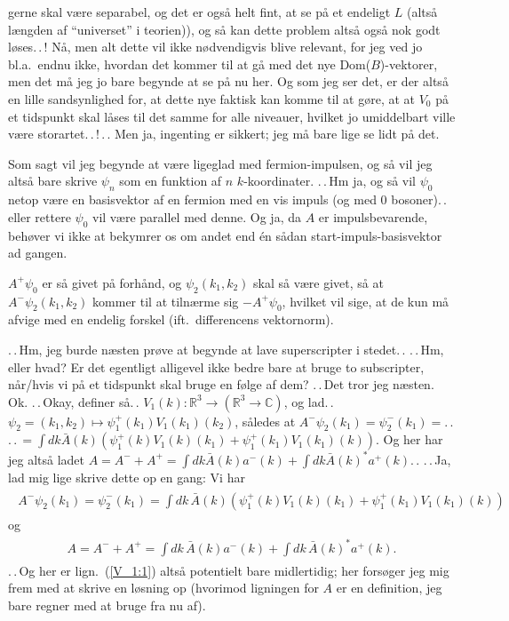 \documentclass{report}
\begin{document}
gerne skal være separabel, og det er også helt fint, at se på et endeligt $L$ (altså længden af ``universet'' i teorien)), og så kan dette problem altså også nok godt løses.\,.\,! Nå, men alt dette vil ikke nødvendigvis blive relevant, for jeg ved jo bl.a.\ endnu ikke, hvordan det kommer til at gå med det nye Dom($B$)-vektorer, men det må jeg jo bare begynde at se på nu her. Og som jeg ser det, er der altså en lille sandsynlighed for, at dette nye faktisk kan komme til at gøre, at at $V_0$ på et tidspunkt skal låses til det samme for alle niveauer, hvilket jo umiddelbart ville være storartet.\,.\,!\,.\,. Men ja, ingenting er sikkert; jeg må bare lige se lidt på det.

Som sagt vil jeg begynde at være ligeglad med fermion-impulsen, og så vil jeg altså bare skrive $\psi_n$ som en funktion af $n$ $k$-koordinater. .\,.\,Hm ja, og så vil $\psi_0$ netop være en basisvektor af en fermion med en vis impuls (og med 0 bosoner).\,. eller rettere $\psi_0$ vil være parallel med denne. Og ja, da $A$ er impulsbevarende, behøver vi ikke at bekymrer os om andet end én sådan start-impuls-basisvektor ad gangen. 

$A^+\psi_0$ er så givet på forhånd, og $\psi_2(k_1, k_2)$ skal så være givet, så at $A^- \psi_2(k_1, k_2)$ kommer til at tilnærme sig $-A^+\psi_0$, hvilket vil sige, at de kun må afvige med en endelig forskel (ift.\ differencens vektornorm). 

.\,.\,Hm, jeg burde næsten prøve at begynde at lave superscripter i stedet.\,. .\,.\,Hm, eller hvad? Er det egentligt alligevel ikke bedre bare at bruge to subscripter, når/hvis vi på et tidspunkt skal bruge en følge af dem? .\,.\,Det tror jeg næsten. Ok. .\,.\,Okay, definer så.\,. $V_1(k): \mathbb{R}^3 \to (\mathbb{R}^3 \to \mathbb{C})$, og lad.\,. $\psi_2 = (k_1, k_2) \mapsto \psi_1^+(k_1) V_1(k_1)(k_2)$, således at $A^- \psi_2(k_1) = \psi_2^-(k_1)=$.\,. .\,.\,$= \int dk \bar{A}(k)(\psi_1^+(k) V_1(k)(k_1) + \psi_1^+(k_1) V_1(k_1)(k))$. Og her har jeg altså ladet $A = A^- + A^+ = \int dk \bar{A}(k) a^-(k) + \int dk\bar{A}(k)^* a^+(k)$.\,. .\,.\,Ja, lad mig lige skrive dette op en gang: Vi har
\begin{align}
\begin{aligned}
	A^- \psi_2(k_1) = \psi_2^-(k_1) = 
		\int dk\, \bar{A}(k)(\psi_1^+(k) V_1(k)(k_1) + \psi_1^+(k_1) V_1(k_1)(k))
	\label{V_1:1}
\end{aligned}
\end{align}
og 
\begin{align}
\begin{aligned}
	A = A^- + A^+ = 
		\int dk\, \bar{A}(k) a^-(k) + \int dk\, \bar{A}(k)^* a^+(k).
\end{aligned}
\end{align}
.\,.\,Og her er lign.\ (\ref{V_1:1}) altså potentielt bare midlertidig; her forsøger jeg mig frem med at skrive en løsning op (hvorimod ligningen for $A$ er en definition, jeg bare regner med at bruge fra nu af).
\end{document}
